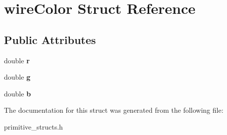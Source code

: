 \hypertarget{structwire_color}{}\section{wire\+Color Struct Reference}
\label{structwire_color}
\subsection*{Public Attributes}
\begin{DoxyCompactItemize}
\item 
double {\bfseries r}\hypertarget{structwire_color_adf14156ab894cc050109279a6a9d3701}{}\label{structwire_color_adf14156ab894cc050109279a6a9d3701}

\item 
double {\bfseries g}\hypertarget{structwire_color_a889ea0fa4764e9c44b790b2e17cf6cd0}{}\label{structwire_color_a889ea0fa4764e9c44b790b2e17cf6cd0}

\item 
double {\bfseries b}\hypertarget{structwire_color_a253caf0a2e7931c12fb67439c8dbe8a5}{}\label{structwire_color_a253caf0a2e7931c12fb67439c8dbe8a5}

\end{DoxyCompactItemize}


The documentation for this struct was generated from the following file\+:\begin{DoxyCompactItemize}
\item 
primitive\+\_\+structs.\+h\end{DoxyCompactItemize}
